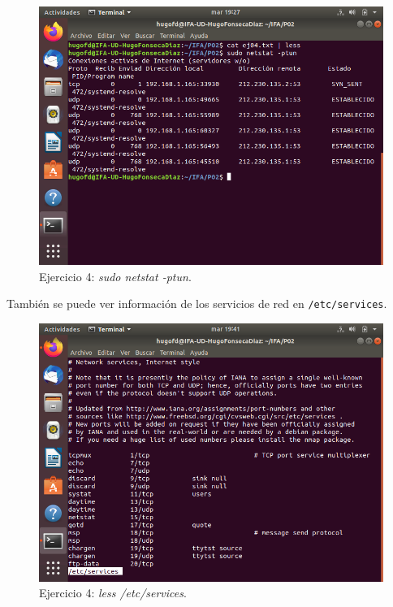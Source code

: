 \documentclass[11pt]{article}
\begin{document}
\begin{figure}[h!]
    \caption{Ejercicio 4: \textit{sudo netstat -ptun}.}
  \centering
  \includegraphics{e4-2.png}
\end{figure}

También se puede ver información de los servicios de red en \verb|/etc/services|.
\begin{figure}[h!]
    \caption{Ejercicio 4: \textit{less /etc/services}.}
  \centering
  \includegraphics{e4-3.png}
\end{figure}
\begin{thebibliography}{8}
\end{thebibliography}
\end{document}
